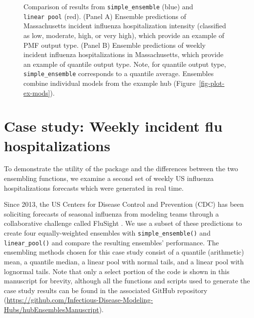 \documentclass[
  article,
  shortnames,
  notitle]{jss}
\begin{document}
\begin{figure}[H]


\caption{\label{fig-plot-ex-quantile-and-linear-pool}Comparison of
results from \texttt{simple\_ensemble} (blue) and \texttt{linear\ pool}
(red). (Panel A) Ensemble predictions of Massachusetts incident
influenza hospitalization intensity (classified as low, moderate, high,
or very high), which provide an example of PMF output type. (Panel B)
Ensemble predictions of weekly incident influenza hospitalizations in
Massachusetts, which provide an example of quantile output type. Note,
for quantile output type, \texttt{simple\_ensemble} corresponds to a
quantile average. Ensembles combine individual models from the example
hub (Figure~\ref{fig-plot-ex-mods}).}

\end{figure}%

\section{Case study: Weekly incident flu
hospitalizations}\label{sec-flu}

To demonstrate the utility of the  package and the
differences between the two ensembling functions, we examine a second
set of weekly US influenza hospitalizations forecasts which were
generated in real time.

Since 2013, the US Centers for Disease Control and Prevention (CDC) has
been soliciting forecasts of seasonal influenza from modeling teams
through a collaborative challenge called FluSight \citep{cdc_flusight}.
We use a subset of these predictions to create four equally-weighted
ensembles with \texttt{simple\_ensemble()} and \texttt{linear\_pool()}
and compare the resulting ensembles' performance. The ensembling methods
chosen for this case study consist of a quantile (arithmetic) mean, a
quantile median, a linear pool with normal tails, and a linear pool with
lognormal tails. Note that only a select portion of the code is shown in
this manuscript for brevity, although all the functions and scripts used
to generate the case study results can be found in the associated GitHub
repository
(\url{https://github.com/Infectious-Disease-Modeling-Hubs/hubEnsemblesManuscript}).
\end{document}

